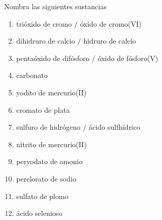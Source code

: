 \begin{exercise}[
    tags    = {inorgánica,nomenclatura,múltiple,2B},
    topics  = {química inorgánica,formulación,nomenclatura},
    source  = {Química 2B SAN 2016, p372, e10},
  ]
  Nombra las siguientes sustancias

  \begin{enumerate}\begin{multicols}{2}
    \item {}
    \item {}
    \item {}
    \item {}
    \item {}
    \item {}
    \item {}
    \item {}
    \item {}
    \item {}
    \item {}
    \item {}
  \end{multicols}\end{enumerate}
\end{exercise}

\begin{solution}
  \begin{enumerate}
    \item trióxido de cromo / óxido de cromo(VI)
    \item dihidruro de calcio / hidruro de calcio
    \item pentaóxido de difósforo / óxido de fósforo(V)
    \item carbonato
    \item yodito de mercurio(II)
    \item cromato de plata
    \item sulfuro de hidrógeno / ácido sulfhídrico
    \item nitrito de mercurio(II)
    \item peryodato de amonio
    \item perclorato de sodio
    \item sulfato de plomo
    \item ácido selenioso
  \end{enumerate}
\end{solution}




